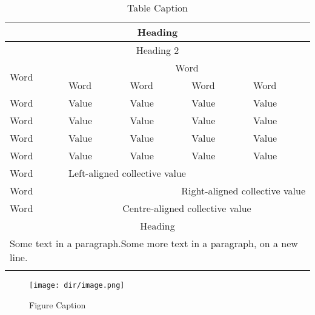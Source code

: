 \documentclass[11pt, english]{article}
\begin{document}
        \begin{center}
                \scriptsize
        \begin{longtable}{p{3cm}|p{2cm}p{2cm}p{2cm}p{2cm}}
                \hline
                \hline
                \multicolumn{5}{c}{Heading}\\
                \hline
                \hline                 
                \multicolumn{5}{c}{Heading 2}\\
                \hline
                \multirow{2}{*}{Word} & \multicolumn{4}{c}{Word}\\
                \cline{2-5}                  
                & Word & Word & Word & Word\\
                \hline
                Word & Value & Value & Value & Value\\
                Word & Value & Value & Value & Value\\
                Word & Value & Value & Value & Value\\
                Word & Value & Value & Value & Value\\
                \hline
                Word & \multicolumn{4}{l}{Left-aligned collective value}\\        
                Word & \multicolumn{4}{r}{Right-aligned collective value}\\        
                Word & \multicolumn{4}{c}{Centre-aligned collective value}\\                                     \hline                                                                           
                \hline
                \multicolumn{5}{c}{Heading}\\
                \hline
                \hline                                                                                           \multicolumn{5}{p{11.5cm}}{Some text in a paragraph.\newline Some more text in a paragraph, on a new line.}\\                                               
                \hline                 
                \caption{Table Caption}
        \end{longtable}                
        \end{center}

	\newpage

	\begin{figure}[H]
	\begin{center}
		\texttt{[image: dir/image.png]}
		\caption{Figure Caption}
	\end{center}
	\end{figure}
\end{document}
